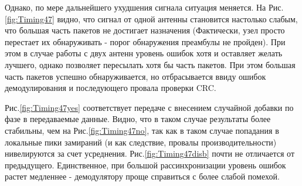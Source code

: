 \documentclass[a4paper,12pt,oneside, abstract=true]{scrartcl}
\begin{document}

\FloatBarrier
Однако, по мере дальнейшего ухудшения сигнала ситуация меняется. 
На Рис.\ref{fig:Timing47} видно, что сигнал от одной антенны становится настолько слабым, что большая часть пакетов не достигает назначения (Фактически, узел просто перестает их обнаруживать - порог обнаружения преамбулы не пройден). 
При этом в случае работы с двух антенн уровень ошибок хотя и оставляет желать лучшего, однако позволяет пересылать хотя бы часть пакетов.
При этом большая часть пакетов успешно обнаруживается, но отбрасывается ввиду ошибок демодулирования и последующего провала проверки CRC.

Рис.\ref{fig:Timing47yes} соответствует передаче с внесением случайной добавки по фазе в передаваемые данные. 
Видно, что в таком случае результаты более стабильны, чем на Рис.\ref{fig:Timing47no}, так как в таком случае попадания в локальные пики замираний (и как следствие, провалы производительности) нивелируются за счет усреднения.
Рис.\ref{fig:Timing47disb} почти не отличается от предыдущего. Единственное, при большой рассинхронизации уровень ошибок растет медленнее - демодулятору проще справиться с более слабой помехой.
\end{document}
